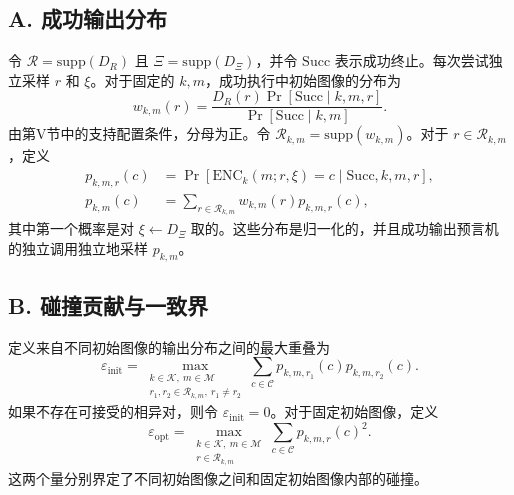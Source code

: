 \documentclass[UTF8,a4paper,zihao=-4,fontset=windows,openany]{ctexbook}
\begin{document}
\subsection*{A. 成功输出分布}
令 \(\mathcal{R} = \mathrm{supp}(D_R)\) 且 \(\Xi = \mathrm{supp}(D_\Xi)\)，并令 \(\mathrm{Succ}\) 表示成功终止。每次尝试独立采样 \(r\) 和 \(\xi\)。对于固定的 \(k, m\)，成功执行中初始图像的分布为
\begin{equation}
w_{k,m}(r) = \frac{D_R(r) \Pr[\mathrm{Succ} \mid k, m, r]}{\Pr[\mathrm{Succ} \mid k, m]}. \tag{29}
\end{equation}
由第V节中的支持配置条件，分母为正。令 \(\mathcal{R}_{k,m} = \mathrm{supp}(w_{k,m})\)。对于 \(r \in \mathcal{R}_{k,m}\)，定义
\begin{equation}
\begin{aligned}
p_{k,m,r}(c) &= \Pr[\mathrm{ENC}_k(m; r, \xi) = c \mid \mathrm{Succ}, k, m, r], \\
p_{k,m}(c) &= \sum_{r \in \mathcal{R}_{k,m}} w_{k,m}(r) p_{k,m,r}(c), 
\end{aligned} \tag{30}
\end{equation}
其中第一个概率是对 \(\xi \leftarrow D_\Xi\) 取的。这些分布是归一化的，并且成功输出预言机的独立调用独立地采样 \(p_{k,m}\)。
\subsection*{B. 碰撞贡献与一致界}

定义来自不同初始图像的输出分布之间的最大重叠为
\begin{equation}
\varepsilon_{\mathrm{init}} = \max_{\substack{k \in \mathcal{K}, \ m \in \mathcal{M} \\ r_1, r_2 \in \mathcal{R}_{k,m}, \ r_1 \neq r_2}} \sum_{c \in \mathcal{C}} p_{k,m,r_1}(c) p_{k,m,r_2}(c). \tag{31}
\end{equation}
如果不存在可接受的相异对，则令 \(\varepsilon_{\mathrm{init}} = 0\)。对于固定初始图像，定义
\begin{equation}
\varepsilon_{\mathrm{opt}} = \max_{\substack{k \in \mathcal{K}, \ m \in \mathcal{M} \\ r \in \mathcal{R}_{k,m}}} \sum_{c \in \mathcal{C}} p_{k,m,r}(c)^2. \tag{32}
\end{equation}
这两个量分别界定了不同初始图像之间和固定初始图像内部的碰撞。
\end{document}
